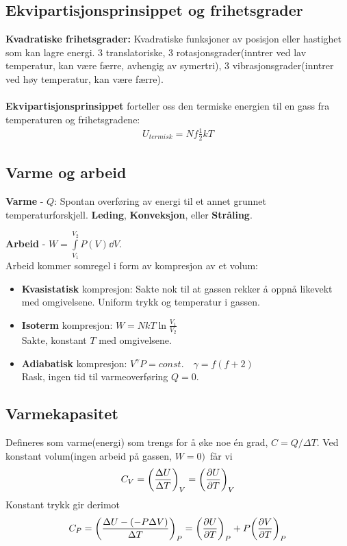 \documentclass[10pt,a4paper]{article}
\renewcommand{\b}{\textbf}
\begin{document}
\begin{multicols}{2}
\subsection*{Ekvipartisjonsprinsippet og frihetsgrader}
\begin{framed}
\b{Kvadratiske frihetsgrader:} Kvadratiske funksjoner av posisjon eller hastighet som kan lagre energi. 3 translatoriske, 3 rotasjonsgrader(inntrer ved lav temperatur, kan være færre, avhengig av symertri), 3 vibrasjonsgrader(inntrer ved høy temperatur, kan være færre).
\\ \\
\b{Ekvipartisjonsprinsippet} forteller oss den termiske energien til en gass fra temperaturen og frihetsgradene:
\begin{align*}
	U_{termisk} = Nf\frac{1}{2}kT
\end{align*}
\end{framed}


\subsection*{Varme og arbeid}
\begin{oframed}
\b{Varme} - $Q$: Spontan overføring av energi til et annet grunnet temperaturforskjell. \b{Leding}, \b{Konveksjon}, eller \b{Stråling}.

\b{Arbeid} - $W = \int\limits_{V_1}^{V_2}P(V)\dd{V}$.\\
Arbeid kommer somregel i form av kompresjon av et volum:
\begin{itemize}
	\item \b{Kvasistatisk} kompresjon: Sakte nok til at gassen rekker å oppnå likevekt med omgivelsene. Uniform trykk og temperatur i gassen.
	\item \b{Isoterm} kompresjon: $ W = NkT\ln{\frac{V_1}{V_2}}$ \\
	Sakte, konstant $T$ med omgivelsene.
	\item \b{Adiabatisk} kompresjon: $ V^\gamma P = const. \quad \gamma = f(f+2)$ \\
	Rask, ingen tid til varmeoverføring $Q=0$.
\end{itemize}
\end{oframed}

\subsection*{Varmekapasitet}
\begin{oframed}
Defineres som varme(energi) som trengs for å øke noe én grad, $C = Q/\Delta T$. Ved konstant volum(ingen arbeid på gassen, $W = 0)$ får vi
\begin{align*}
	C_V = \qty(\frac{\Delta U}{\Delta T})_V = \qty(\pdv{U}{T})_V
\end{align*}
Konstant trykk gir derimot
\begin{align*}
	C_P = \qty(\frac{\Delta U - (-P\Delta V)}{\Delta T})_P = \qty(\pdv{U}{T})_P + P\qty(\pdv{V}{T})_P
\end{align*}
\\


\end{oframed}
\end{multicols}
\end{document}

